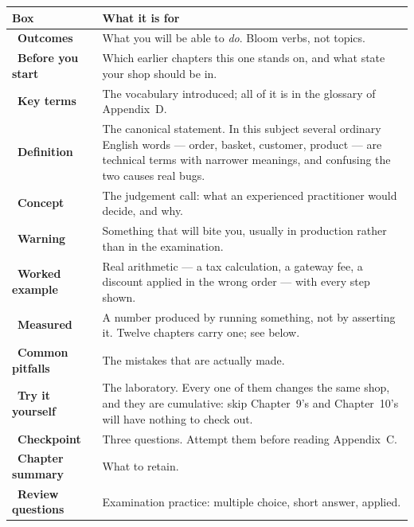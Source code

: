 \begin{longtable}{@{}L{4.6cm}L{10.6cm}@{}}
\toprule
{}
\textbf{Box} & \textbf{What it is for} \\
\midrule
\endhead
{}~\textbf{Outcomes} & What you will be able to \emph{do}. Bloom
verbs, not topics. \\
~\textbf{Before you start} & Which earlier chapters this one stands
on, and what state your shop should be in. \\
~\textbf{Key terms} & The vocabulary introduced; all of it is in the
glossary of Appendix~D. \\
~\textbf{Definition} & The canonical statement. In this subject
several ordinary English words --- order, basket, customer, product --- are
technical terms with narrower meanings, and confusing the two causes real bugs. \\
~\textbf{Concept} & The judgement call: what an experienced
practitioner would decide, and why. \\
~\textbf{Warning} & Something that will bite you,
usually in production rather than in the examination. \\
~\textbf{Worked example} & Real arithmetic --- a tax
calculation, a gateway fee, a discount applied in the wrong order --- with every
step shown. \\
~\textbf{Measured} & A number produced by running
something, not by asserting it. Twelve chapters carry one; see below. \\
~\textbf{Common pitfalls} & The mistakes that are
actually made. \\
~\textbf{Try it yourself} & The laboratory. Every one of them
changes the same shop, and they are cumulative: skip Chapter~9's and
Chapter~10's will have nothing to check out. \\
~\textbf{Checkpoint} & Three questions. Attempt them
before reading Appendix~C. \\
~\textbf{Chapter summary} & What to retain. \\
~\textbf{Review questions} & Examination practice: multiple
choice, short answer, applied. \\
\bottomrule
\end{longtable}

\newpage

